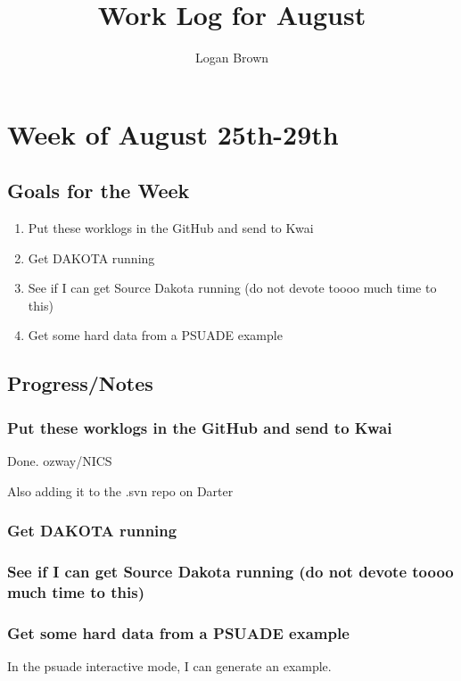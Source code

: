 \documentclass[11pt]{article} %
\title{Work Log for August}
\author{Logan Brown}
\begin{document}
\maketitle


\setcounter{section}{3} %
\setcounter{subsection}{-1}
\setcounter{subsubsection}{0}

\section{Week of August 25th-29th}
\subsection{Goals for the Week}
\begin{enumerate}
	\item Put these worklogs in the GitHub and send to Kwai
	\item Get DAKOTA running
	\item See if I can get Source Dakota running (do not devote toooo much time to this)
	\item Get some hard data from a PSUADE example
\end{enumerate}

\subsection{Progress/Notes}
\subsubsection{Put these worklogs in the GitHub and send to Kwai}
Done. ozway/NICS

Also adding it to the .svn repo on Darter

\subsubsection{Get DAKOTA running}

\subsubsection{See if I can get Source Dakota running (do not devote toooo much time to this)}

\subsubsection{Get some hard data from a PSUADE example}
In the psuade interactive mode, I can generate an example.
\end{document}
